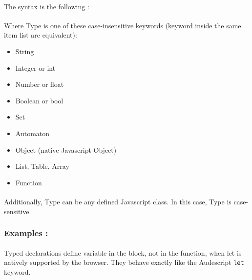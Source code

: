 \documentclass{article}
\begin{document}
\begin{sloppypar}
      
\paragraph{}
The syntax is the following :
      
      {}
      
      
\paragraph{}
Where Type is one of these case-insensitive keywords (keyword inside the same item list are equivalent):
       
\begin{itemize}
	\item{ String}
	\item{ Integer or int}
	\item{ Number or float}
	\item{ Boolean or bool}
	\item{ Set}
	\item{ Automaton}
	\item{ Object (native Javascript Object)}
	\item{ List, Table, Array}
	\item{ Function}
\end{itemize}

\paragraph{}
Additionally, Type can be any defined Javascript class. In this case, Type is case-sensitive.

      

\subsubsection{ Examples :}

{}
      

      
\paragraph{}
Typed declarations define variable in the block, not in the function, when let is natively supported by the browser. They behave exactly like the Audescript \verb!let! keyword.


\end{sloppypar}
\end{document}
